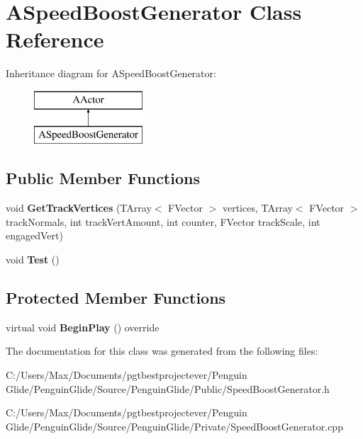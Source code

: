 \hypertarget{class_a_speed_boost_generator}{}\section{A\+Speed\+Boost\+Generator Class Reference}
\label{class_a_speed_boost_generator}
Inheritance diagram for A\+Speed\+Boost\+Generator\+:\begin{figure}[H]
\begin{center}
\leavevmode
\includegraphics[height=2.000000cm]{class_a_speed_boost_generator}
\end{center}
\end{figure}
\subsection*{Public Member Functions}
\begin{DoxyCompactItemize}
\item 
\mbox{\label{class_a_speed_boost_generator_a483ba1497a645f4bc1a9a861c4a9bbe8}} 
void {\bfseries Get\+Track\+Vertices} (T\+Array$<$ F\+Vector $>$ vertices, T\+Array$<$ F\+Vector $>$ track\+Normals, int track\+Vert\+Amount, int counter, F\+Vector track\+Scale, int engaged\+Vert)
\item 
\mbox{\label{class_a_speed_boost_generator_aa2a3b196ad2458ab97186c7b5d87cfb0}} 
void {\bfseries Test} ()
\end{DoxyCompactItemize}
\subsection*{Protected Member Functions}
\begin{DoxyCompactItemize}
\item 
\mbox{\label{class_a_speed_boost_generator_a0955d69b464390d67fce233692d2d704}} 
virtual void {\bfseries Begin\+Play} () override
\end{DoxyCompactItemize}


The documentation for this class was generated from the following files\+:\begin{DoxyCompactItemize}
\item 
C\+:/\+Users/\+Max/\+Documents/pgtbestprojectever/\+Penguin Glide/\+Penguin\+Glide/\+Source/\+Penguin\+Glide/\+Public/Speed\+Boost\+Generator.\+h\item 
C\+:/\+Users/\+Max/\+Documents/pgtbestprojectever/\+Penguin Glide/\+Penguin\+Glide/\+Source/\+Penguin\+Glide/\+Private/Speed\+Boost\+Generator.\+cpp\end{DoxyCompactItemize}
